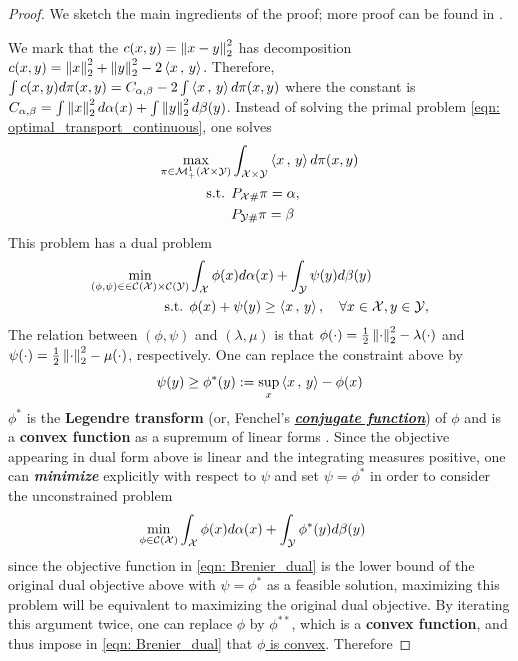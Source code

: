 \documentclass[11pt]{article}
\begin{document}
\begin{proof}
We sketch the main ingredients of the proof; more proof can be found in \citep{santambrogio2015optimal, figalli2021invitation}.

We mark that the $c(x, y) = \left\|x -y\right\|_{2}^2$ has decomposition $c(x, y) = \left\|x\right\|_{2}^2 + \left\|y\right\|_{2}^2 - 2 \left\langle x\,,\, y \right\rangle$. Therefore,  $\int c(x,y) d\pi(x, y) = C_{\alpha, \beta} - 2 \int  \left\langle x\,,\, y \right\rangle d\pi(x, y)$ where the constant is $C_{\alpha, \beta} = \int \left\|x\right\|_{2}^2 d\alpha(x) + \int \left\|y\right\|_{2}^2 d\beta(y)$. Instead of solving the primal problem \eqref{eqn: optimal_transport_continuous}, one solves 
\begin{align*}
\max_{\pi \in {\mathcal M}_{+}^{1}({\mathcal X} \times {\mathcal Y})}& \int_{{\mathcal X} \times {\mathcal Y}} \left\langle x\,,\, y \right\rangle d \pi(x, y)   \\
\text{s.t. }& P_{{\mathcal X} \#}\pi = \alpha,  \nonumber \\
& P_{{\mathcal Y} \#}\pi = \beta  \nonumber
\end{align*} This problem has a dual problem 
\begin{align*}
 \min_{(\phi,  \psi) \in \in {\mathcal C}({\mathcal X})\times {\mathcal C}({\mathcal Y})} & \int_{{\mathcal X}}\phi(x) d\alpha(x) + \int_{{\mathcal Y}}\psi(y) d\beta(y) \\
\text{s.t. }&  \phi(x) + \psi(y) \ge \left\langle x\,,\, y \right\rangle,\quad \forall x\in {\mathcal X}, y \in {\mathcal Y},
\end{align*} The relation between $(\phi,  \psi)$ and $(\lambda, \mu)$ is that $\phi(\cdot) = \frac{1}{2}\left\|\cdot\right\|_{2}^2 - \lambda(\cdot)$ and $\psi(\cdot) = \frac{1}{2}\left\|\cdot\right\|_{2}^2 - \mu(\cdot)$, respectively. One can replace the constraint above by
\begin{align}
\psi(y) \ge \phi^{*}(y) := \sup_{x}\left\langle x\,,\, y \right\rangle - \phi(x) \label{eqn: Brenier_conjugate}
\end{align} $\phi^{*}$ is the \textbf{Legendre transform} (or, Fenchel's \underline{\emph{\textbf{conjugate function}}}) of $\phi$ and is a \textbf{convex function} as a supremum of linear forms \citep{rockafellar1970convex}. Since the objective appearing in dual form above is linear and the integrating measures positive, one can \emph{\textbf{minimize}} explicitly with respect to $\psi$ and set $\psi = \phi^{*}$ in order to consider the unconstrained problem 
\begin{align}
\min_{\phi\in {\mathcal C}({\mathcal X})} & \int_{{\mathcal X}}\phi(x) d\alpha(x) + \int_{{\mathcal Y}}\phi^{*}(y) d\beta(y) \label{eqn: Brenier_dual}
\end{align} since the objective function in \eqref{eqn: Brenier_dual} is the lower bound of the original dual objective above with $\psi = \phi^{*}$ as a feasible solution, maximizing this problem will be equivalent to maximizing the original dual objective.  By iterating this argument twice, one can replace $\phi$ by $\phi^{**}$, which is a \textbf{convex function}, and thus impose in \eqref{eqn: Brenier_dual} that \underline{$\phi$ is convex}. Therefore

\end{proof}
\end{document}
